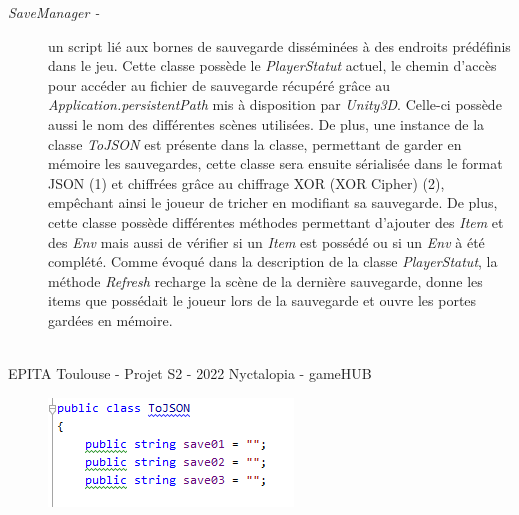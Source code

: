 \begin{description}
  \item[\emph{SaveManager -}] un script lié aux bornes de sauvegarde disséminées à des endroits prédéfinis dans le jeu. Cette classe possède le \emph{PlayerStatut} actuel, le chemin d'accès pour accéder au fichier de sauvegarde récupéré grâce au \emph{Application.persistentPath} mis à disposition par \emph{Unity3D}. Celle-ci possède aussi le nom des différentes scènes utilisées.
  \newline
  De plus, une instance de la classe \emph{ToJSON} est présente dans la classe, permettant de garder en mémoire les sauvegardes, cette classe sera ensuite sérialisée dans le format JSON (1) et chiffrées grâce au chiffrage XOR (XOR Cipher) (2), empêchant ainsi le joueur de tricher en modifiant sa sauvegarde.
  De plus, cette classe possède différentes méthodes permettant d'ajouter des \emph{Item} et des \emph{Env} mais aussi de vérifier si un \emph{Item} est possédé ou si un \emph{Env} à été complété.
  Comme évoqué dans la description de la classe \emph{PlayerStatut}, la méthode \emph{Refresh} recharge la scène de la dernière sauvegarde, donne les items que possédait le joueur lors de la sauvegarde et ouvre les portes gardées en mémoire.
\end{description}
 
 
\vfill
\noindent\makebox[\linewidth]{\rule{.8\paperwidth}{.6pt}}\\[0.2cm]
EPITA Toulouse - Projet S2 - 2022 \hfill Nyctalopia - gameHUB
\noindent\makebox[\linewidth]{\rule{.8\paperwidth}{.6pt}}

\newpage

\begin{figure}[H]
\centering
\begin{minipage}{.5\textwidth}
  \centering
  \centerline{\includegraphics[width=1.5\linewidth]{img/gameplay/tojson.PNG}}
  \label{fig:octobercrowfont}
\end{minipage}%
\end{figure}
 
